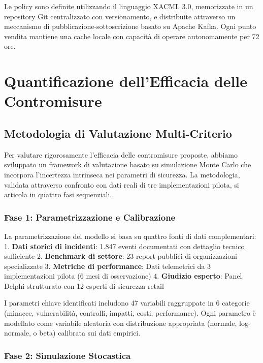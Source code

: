 Le policy sono definite utilizzando il linguaggio XACML 3.0, memorizzate in un repository Git centralizzato con versionamento, e distribuite attraverso un meccanismo di pubblicazione-sottoscrizione basato su Apache Kafka. Ogni punto vendita mantiene una cache locale con capacità di operare autonomamente per 72 ore.

\section{Quantificazione dell'Efficacia delle Contromisure}

\subsection{Metodologia di Valutazione Multi-Criterio}

Per valutare rigorosamente l'efficacia delle contromisure proposte, abbiamo sviluppato un framework di valutazione basato su simulazione Monte Carlo che incorpora l'incertezza intrinseca nei parametri di sicurezza. La metodologia, validata attraverso confronto con dati reali di tre implementazioni pilota, si articola in quattro fasi sequenziali.

\subsubsection{Fase 1: Parametrizzazione e Calibrazione}

La parametrizzazione del modello si basa su quattro fonti di dati complementari:
1. \textbf{Dati storici di incidenti}: 1.847 eventi documentati con dettaglio tecnico sufficiente
2. \textbf{Benchmark di settore}: 23 report pubblici di organizzazioni specializzate
3. \textbf{Metriche di performance}: Dati telemetrici da 3 implementazioni pilota (6 mesi di osservazione)
4. \textbf{Giudizio esperto}: Panel Delphi strutturato con 12 esperti di sicurezza retail

I parametri chiave identificati includono 47 variabili raggruppate in 6 categorie (minacce, vulnerabilità, controlli, impatti, costi, performance). Ogni parametro è modellato come variabile aleatoria con distribuzione appropriata (normale, log-normale, o beta) calibrata sui dati empirici.

\subsubsection{Fase 2: Simulazione Stocastica}

